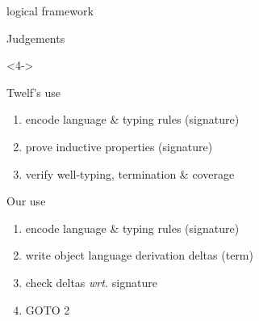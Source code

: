 \documentclass[ignorenonframetext,red]{beamer}
\begin{document}
\begin{frame}{ logical framework }
\begin{onlyenv}
\begin{block}{Judgements}
    \end{block}
  \end{onlyenv}
  \begin{onlyenv}<4->
    \begin{block}{\textsf{Twelf}'s use}
      \begin{enumerate}
      \item encode language \& typing rules (signature)
      \item prove inductive properties (signature)
      \item verify well-typing, termination \& coverage
      \end{enumerate}
    \end{block}
    \pause\pause
    \begin{block}{Our use}
      \begin{enumerate}
      \item encode language \& typing rules (signature)
      \item write object language derivation deltas (term)
      \item check deltas \emph{wrt.} signature
      \item GOTO 2
      \end{enumerate}
    \end{block}
  \end{onlyenv}
\end{frame}


\end{document}
